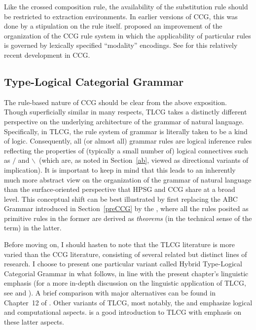 \documentclass[output=paper,biblatex,babelshorthands,newtxmath,draftmode,colorlinks,citecolor=brown]{langscibook}
\begin{document}
Like the crossed composition rule, the availability of the
substitution rule should be restricted to extraction environments. In
earlier versions of CCG, this was done by a stipulation on
the rule itself. \citet{Baldridge2002a-u} proposed an improvement of the
organization of the CCG rule system in which the applicability of
particular rules is governed by lexically specified ``modality''
encodings. See \citet{steedman2011ccg} for this relatively recent
development in CCG.\indexccgend

\subsection{Type-Logical Categorial Grammar \label{sectlg}}

The rule-based nature of CCG should be clear from the above
exposition. Though superficially similar in many respects,
TLCG takes a distinctly different perspective on the
underlying architecture of the grammar of natural language.
Specifically, in TLCG, the rule system of grammar is literally taken
to be a kind of logic. Consequently, all (or almost all) grammar rules are logical
inference rules reflecting the properties of (typically a small number
of) logical connectives such as \ensuremath{/} and
\ensuremath{\backslash}\ (which are, as noted in Section~\ref{ab}, viewed as
directional variants of implication).
It is important to keep in mind that this leads to
an inherently much more abstract view on the
organization of the grammar of natural language than the
surface-oriented perspective that HPSG and CCG share
at a broad level. This conceptual shift can be
best illustrated by first replacing the ABC Grammar introduced in
Section~\ref{preCCG} by the , where all the rules
posited as primitive rules in the former are derived as \emph{theorems} (in
the technical sense of the term) in the latter.

Before moving on, I should hasten to note that the TLCG literature is
more varied than the CCG literature, consisting of several related but
distinct lines of research. I choose to present one particular variant
called Hybrid Type-Logical Categorial Grammar \citep{KubotaLevineBook}
in what follows, in line with the present chapter's linguistic
emphasis (for a more in-depth discussion on the linguistic application
of TLCG, see \citealt{Carpenter98a-u} and \citealt{KubotaLevineBook}).
A brief comparison with major alternatives
can be found in Chapter~12 of \citet{KubotaLevineBook}. 
Other variants of TLCG, most notably, the
 \citep{Moortgat2011a-u} and
 \citep{morrill2011} emphasize logical
and computational aspects. \citet{mootretore2012} is a good
introduction to TLCG with emphasis on these latter aspects.
\end{document}
